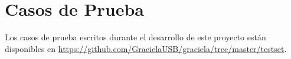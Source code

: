 \chapter{Casos de Prueba}
\label{testset}

Los casos de prueba escritos durante el desarrollo de este proyecto están disponibles en \url{https://github.com/GracielaUSB/graciela/tree/master/testset}. 
